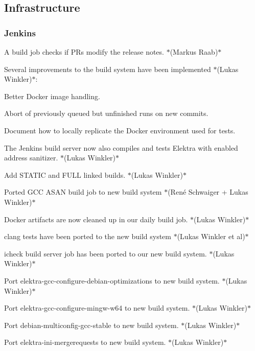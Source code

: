 \subsection*{Infrastructure}

\subsubsection*{Jenkins}


\begin{DoxyItemize}
\item A build job checks if P\+Rs modify the release notes. $\ast$(Markus Raab)$\ast$
\item Several improvements to the build system have been implemented $\ast$(Lukas Winkler)$\ast$\+:
\begin{DoxyItemize}
\item Better Docker image handling.
\item Abort of previously queued but unfinished runs on new commits.
\item Document how to locally replicate the Docker environment used for tests.
\end{DoxyItemize}
\item The Jenkins build server now also compiles and tests Elektra with enabled address sanitizer. $\ast$(Lukas Winkler)$\ast$
\item Add {\ttfamily S\+T\+A\+T\+IC} and {\ttfamily F\+U\+LL} linked builds. $\ast$(Lukas Winkler)$\ast$
\item Ported G\+CC A\+S\+AN build job to new build system $\ast$(René Schwaiger + Lukas Winkler)$\ast$
\item Docker artifacts are now cleaned up in our daily build job. $\ast$(Lukas Winkler)$\ast$
\item {\ttfamily clang} tests have been ported to the new build system $\ast$(Lukas Winkler et al)$\ast$
\item {\ttfamily icheck} build server job has been ported to our new build system. $\ast$(Lukas Winkler)$\ast$
\item Port {\ttfamily elektra-\/gcc-\/configure-\/debian-\/optimizations} to new build system. $\ast$(Lukas Winkler)$\ast$
\item Port {\ttfamily elektra-\/gcc-\/configure-\/mingw-\/w64} to new build system. $\ast$(Lukas Winkler)$\ast$
\item Port {\ttfamily debian-\/multiconfig-\/gcc-\/stable} to new build system. $\ast$(Lukas Winkler)$\ast$
\item Port {\ttfamily elektra-\/ini-\/mergerequests} to new build system. $\ast$(Lukas Winkler)$\ast$

\end{DoxyItemize}
